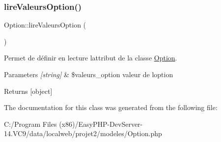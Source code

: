 \subsubsection{\texorpdfstring{lire\+Valeurs\+Option()}{lireValeursOption()}}
{\footnotesize\ttfamily Option\+::lire\+Valeurs\+Option (\begin{DoxyParamCaption}{ }\end{DoxyParamCaption})}



Permet de définir en lecture l\textquotesingle{}attribut de la classe \hyperlink{class_option}{Option}. 


\begin{DoxyParams}{Parameters}
{\em \mbox{[}string\mbox{]}} & \$valeurs\+\_\+option valeur de l\textquotesingle{}option \\
\hline
\end{DoxyParams}
\begin{DoxyReturn}{Returns}
\mbox{[}object\mbox{]} 
\end{DoxyReturn}


The documentation for this class was generated from the following file\+:\begin{DoxyCompactItemize}
\item 
C\+:/\+Program Files (x86)/\+Easy\+P\+H\+P-\/\+Dev\+Server-\/14.\+V\+C9/data/localweb/projet2/modeles/Option.\+php\end{DoxyCompactItemize}
